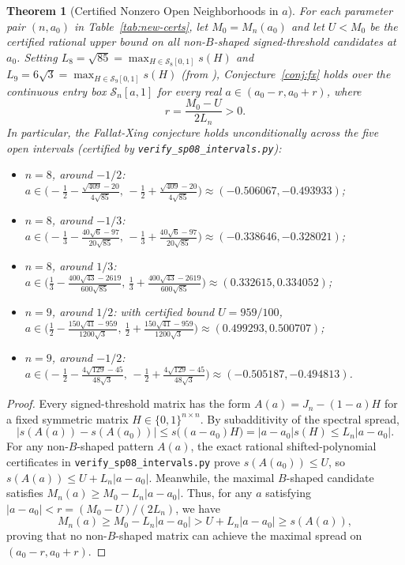 \documentclass[11pt,reqno]{article}
\newtheorem{theorem}{Theorem}[section]
\theoremstyle{definition}
\begin{document}
\begin{theorem}[Certified Nonzero Open Neighborhoods in $a$]\label{thm:open-intervals}
For each parameter pair $(n, a_0)$ in Table~\ref{tab:new-certs}, let $M_0 = M_n(a_0)$ and let $U < M_0$ be the certified rational upper bound on all non-$B$-shaped signed-threshold candidates at $a_0$. Setting $L_8 = \sqrt{85} = \max_{H \in \mathcal{S}_8[0, 1]} s(H)$ and $L_9 = 6\sqrt{3} = \max_{H \in \mathcal{S}_9[0, 1]} s(H)$ (from \cite{corless2025bohemian}), Conjecture~\ref{conj:fx} holds over the continuous entry box $\mathcal{S}_n[a, 1]$ for every real $a \in (a_0 - r, a_0 + r)$, where
\begin{equation}
r = \frac{M_0 - U}{2 L_n} > 0.
\end{equation}
In particular, the Fallat-Xing conjecture holds unconditionally across the five open intervals (certified by \texttt{verify\_sp08\_intervals.py}):
\begin{itemize}
    \item $n=8$, around $-1/2$: $a \in \bigl(-\frac{1}{2} - \frac{\sqrt{409}-20}{4\sqrt{85}},\, -\frac{1}{2} + \frac{\sqrt{409}-20}{4\sqrt{85}}\bigr) \approx (-0.506067, -0.493933)$;
    \item $n=8$, around $-1/3$: $a \in \bigl(-\frac{1}{3} - \frac{40\sqrt{6}-97}{20\sqrt{85}},\, -\frac{1}{3} + \frac{40\sqrt{6}-97}{20\sqrt{85}}\bigr) \approx (-0.338646, -0.328021)$;
    \item $n=8$, around $1/3$: $a \in \bigl(\frac{1}{3} - \frac{400\sqrt{43}-2619}{600\sqrt{85}},\, \frac{1}{3} + \frac{400\sqrt{43}-2619}{600\sqrt{85}}\bigr) \approx (0.332615, 0.334052)$;
    \item $n=9$, around $1/2$: with certified bound $U = 959/100$, $a \in \bigl(\frac{1}{2} - \frac{150\sqrt{41}-959}{1200\sqrt{3}},\, \frac{1}{2} + \frac{150\sqrt{41}-959}{1200\sqrt{3}}\bigr) \approx (0.499293, 0.500707)$;
    \item $n=9$, around $-1/2$: $a \in \bigl(-\frac{1}{2} - \frac{4\sqrt{129}-45}{48\sqrt{3}},\, -\frac{1}{2} + \frac{4\sqrt{129}-45}{48\sqrt{3}}\bigr) \approx (-0.505187, -0.494813)$.
\end{itemize}
\end{theorem}
\begin{proof}
Every signed-threshold matrix has the form $A(a) = J_n - (1-a)H$ for a fixed symmetric matrix $H \in \{0, 1\}^{n \times n}$. By subadditivity of the spectral spread,
\[
|s(A(a)) - s(A(a_0))| \le s\bigl((a - a_0)H\bigr) = |a - a_0| s(H) \le L_n |a - a_0|.
\]
For any non-$B$-shaped pattern $A(a)$, the exact rational shifted-polynomial certificates in \texttt{verify\_sp08\_intervals.py} prove $s(A(a_0)) \le U$, so $s(A(a)) \le U + L_n |a - a_0|$. Meanwhile, the maximal $B$-shaped candidate satisfies $M_n(a) \ge M_0 - L_n |a - a_0|$. Thus, for any $a$ satisfying $|a - a_0| < r = (M_0 - U)/(2 L_n)$, we have
\[
M_n(a) \ge M_0 - L_n |a - a_0| > U + L_n |a - a_0| \ge s(A(a)),
\]
proving that no non-$B$-shaped matrix can achieve the maximal spread on $(a_0 - r, a_0 + r)$.
\end{proof}
\end{document}
